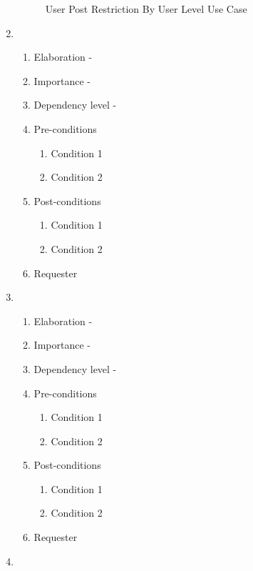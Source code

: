 \documentclass[12pt]{article}
\begin{document}
\begin{enumerate}
\begin{figure}[h]
	\caption{User Post Restriction By User Level Use Case}
\end{figure}
\newpage %
   \item  %
  \begin{enumerate}
    \item Elaboration - 
    \item Importance - 
    \item Dependency level - 
    \item Pre-conditions
    \begin{enumerate}
    	\item Condition 1
    	\item Condition 2
    \end{enumerate}
        \item Post-conditions
    \begin{enumerate}
    	\item Condition 1
    	\item Condition 2
    \end{enumerate}
    \item Requester
  \end{enumerate}
\newpage %
   \item  %
  \begin{enumerate}
    \item Elaboration - 
    \item Importance - 
    \item Dependency level - 
    \item Pre-conditions
    \begin{enumerate}
    	\item Condition 1
    	\item Condition 2
    \end{enumerate}
        \item Post-conditions
    \begin{enumerate}
    	\item Condition 1
    	\item Condition 2
    \end{enumerate}
    \item Requester
  \end{enumerate}
\newpage %
   \item  %

\end{enumerate}
\end{document}
